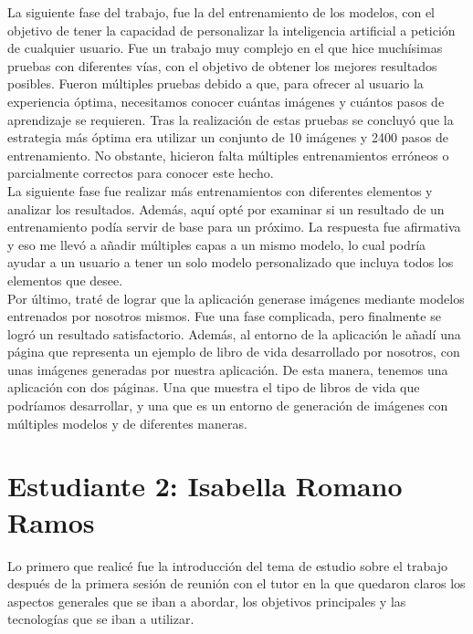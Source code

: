 La siguiente fase del trabajo, fue la del entrenamiento de los modelos, con el objetivo de tener la capacidad de personalizar la inteligencia artificial a petición de cualquier usuario. Fue un trabajo muy complejo en el que hice muchísimas pruebas con diferentes vías, con el objetivo de obtener los mejores resultados posibles. Fueron múltiples pruebas debido a que, para ofrecer al usuario la experiencia óptima, necesitamos conocer cuántas imágenes y cuántos pasos de aprendizaje se requieren. Tras la realización de estas pruebas se concluyó que la estrategia más óptima era utilizar un conjunto de 10 imágenes y 2400 pasos de entrenamiento. No obstante, hicieron falta múltiples entrenamientos erróneos o parcialmente correctos para conocer este hecho. \\

La siguiente fase fue realizar más entrenamientos con diferentes elementos y analizar los resultados. Además, aquí opté por examinar si un resultado de un entrenamiento podía servir de base para un próximo. La respuesta fue afirmativa y eso me llevó a añadir múltiples capas a un mismo modelo, lo cual podría ayudar a un usuario a tener un solo modelo personalizado que incluya todos los elementos que desee. \\

Por último, traté de lograr que la aplicación generase imágenes mediante modelos entrenados por nosotros mismos. Fue una fase complicada, pero finalmente se logró un resultado satisfactorio. Además, al entorno de la aplicación le añadí una página que representa un ejemplo de libro de vida desarrollado por nosotros, con unas imágenes generadas por nuestra aplicación. De esta manera, tenemos una aplicación con dos páginas. Una que muestra el tipo de libros de vida que podríamos desarrollar, y una que es un entorno de generación de imágenes con múltiples modelos y de diferentes maneras.


\section*{Estudiante 2: Isabella Romano Ramos}
Lo primero que realicé fue la introducción del tema de estudio sobre el trabajo después de la primera sesión de reunión con el tutor en la que quedaron claros los aspectos generales que se iban a abordar, los objetivos principales y las tecnologías que se iban a utilizar. \\

